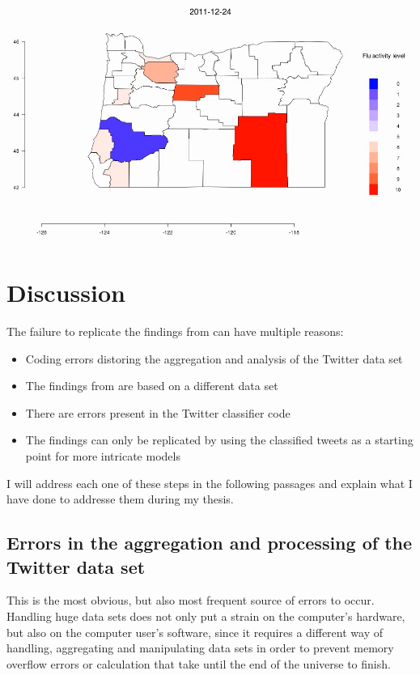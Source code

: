 \documentclass[11pt, a4paper]{report}\usepackage[]{graphicx}\usepackage[]{color}
\begin{document}
\centering \href{run:vids/county_Twitter_cdc_diff_oregon.avi}{\includegraphics[scale=0.5]{vids/Screenshot_Oregon.png}} 
\raggedright

\chapter{Discussion}
The failure to replicate the findings from \citep{bodnar_data_2015} can have multiple reasons: 

\begin{itemize}
\item Coding errors distoring the aggregation and analysis of the Twitter data set
\item The findings from \citep{bodnar_data_2015} are based on a different data set
\item There are errors present in the Twitter classifier code
\item The findings can only be replicated by using the classified tweets as a starting point for more intricate models
\end{itemize}

I will address each one of these steps in the following passages and explain what I have done to addresse them during my thesis. 

\section{Errors in the aggregation and processing of the Twitter data set}
This is the most obvious, but also most frequent source of errors to occur. Handling huge data sets does not only put a strain on the computer's hardware, but also on the computer user's software, since it requires a different way of handling, aggregating and manipulating data sets in order to prevent memory overflow errors or calculation that take until the end of the universe to finish.\newline
\end{document}
